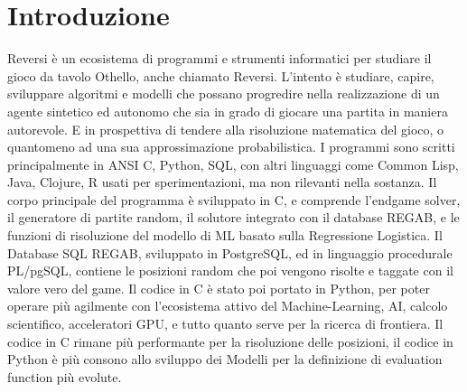 %
%
%
%
%
%
%
%
\chapter{Introduzione}

Reversi è un ecosistema di programmi e strumenti informatici per studiare il gioco da tavolo Othello, anche chiamato Reversi.
L'intento è studiare, capire, sviluppare algoritmi e modelli che possano progredire nella realizzazione di un agente
sintetico ed autonomo che sia in grado di giocare una partita in maniera autorevole. E in prospettiva di tendere alla
risoluzione matematica del gioco, o quantomeno ad una sua approssimazione probabilistica.
I programmi sono scritti principalmente in ANSI C, Python, SQL, con altri linguaggi come Common Lisp, Java, Clojure, R usati
per sperimentazioni, ma non rilevanti nella sostanza.
Il corpo principale del programma è sviluppato in C, e comprende l'endgame solver, il generatore di partite random, il
solutore integrato con il database REGAB, e le funzioni di risoluzione del modello di ML basato sulla Regressione Logistica.
Il Database SQL REGAB, sviluppato in PostgreSQL, ed in linguaggio procedurale PL/pgSQL, contiene le posizioni random
che poi vengono risolte e taggate con il valore vero del game.
Il codice in C è stato poi portato in Python, per poter operare più agilmente con l'ecosistema attivo del Machine-Learning, AI,
calcolo scientifico, acceleratori GPU, e tutto quanto serve per la ricerca di frontiera.
Il codice in C rimane più performante per la risoluzione delle posizioni, il codice in Python è più consono allo sviluppo
dei Modelli per la definizione di evaluation function più evolute.
